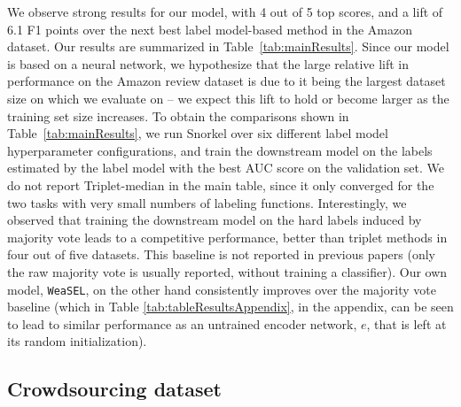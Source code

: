 \documentclass{article}
\newcommand{\weasel}{\texttt{WeaSEL}}\newcommand{\brackets}[1]{\left( #1 \right)}
\begin{document}
We observe strong results for our model, with 4 out of 5 top scores, and a lift of 6.1 F1 points over the next best label model-based method in the Amazon dataset. Our results are summarized in Table~\ref{tab:mainResults}.
Since our model is based on a neural network, we hypothesize that the large relative lift in performance on the Amazon review dataset is due to it being the largest dataset size on which we evaluate on -- we expect this lift to hold or become larger as the training set size increases. 
To obtain the comparisons shown in Table~\ref{tab:mainResults}, we run Snorkel over six different label model hyperparameter configurations, and train the downstream model on the labels estimated by the label model with the best AUC score on the validation set.  We do not report Triplet-median in the main table, since it only converged for the two tasks with very small numbers of labeling functions. 
Interestingly, we observed that training the downstream model on the hard labels induced by majority vote leads to a competitive performance, better than triplet methods in four out of five datasets. This baseline is not reported in previous papers (only the raw majority vote is usually reported, without training a classifier). Our own model, \weasel, on the other hand consistently improves over the majority vote baseline (which in Table \ref{tab:tableResultsAppendix}, in the appendix, can be seen to lead to similar performance as an untrained encoder network, $e$, that is left at its random initialization).
\subsection{Crowdsourcing dataset} \label{sec:crowdsourcing}
\end{document}
